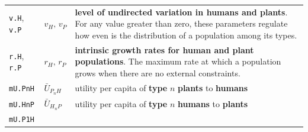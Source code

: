 \documentclass[]{book}
\begin{document}
\begin{longtable}[]{@{}lll@{}}
\begin{minipage}[t]{0.27\columnwidth}
\texttt{v.H}, \texttt{v.P}\strut
\end{minipage} & \begin{minipage}[t]{0.25\columnwidth}\raggedright
\(v_{H},\,v_{P}\)\strut
\end{minipage} & \begin{minipage}[t]{0.40\columnwidth}\raggedright
\textbf{level of undirected variation in humans and plants}. For any value greater than zero, these parameters regulate how even is the distribution of a population among its types.\strut
\end{minipage}\tabularnewline
\begin{minipage}[t]{0.27\columnwidth}\raggedright
\texttt{r.H}, \texttt{r.P}\strut
\end{minipage} & \begin{minipage}[t]{0.25\columnwidth}\raggedright
\(r_{H},\,r_{P}\)\strut
\end{minipage} & \begin{minipage}[t]{0.40\columnwidth}\raggedright
\textbf{intrinsic growth rates for human and plant populations}. The maximum rate at which a population grows when there are no external constraints.\strut
\end{minipage}\tabularnewline
\begin{minipage}[t]{0.27\columnwidth}\raggedright
\texttt{mU.PnH}\strut
\end{minipage} & \begin{minipage}[t]{0.25\columnwidth}\raggedright
\(\bar{U}_{P_{n}H}\)\strut
\end{minipage} & \begin{minipage}[t]{0.40\columnwidth}\raggedright
utility per capita of \textbf{type} \(n\) \textbf{plants} to \textbf{humans}\strut
\end{minipage}\tabularnewline
\begin{minipage}[t]{0.27\columnwidth}\raggedright
\texttt{mU.HnP}\strut
\end{minipage} & \begin{minipage}[t]{0.25\columnwidth}\raggedright
\(\bar{U}_{H_{n}P}\)\strut
\end{minipage} & \begin{minipage}[t]{0.40\columnwidth}\raggedright
utility per capita of \textbf{type} \(n\) \textbf{humans} to \textbf{plants}\strut
\end{minipage}\tabularnewline
\begin{minipage}[t]{0.27\columnwidth}\raggedright
\texttt{mU.P1H}\strut
\end{minipage} & \begin{minipage}[t]{0.25\columnwidth}\raggedright

\end{minipage}
\end{longtable}
\end{document}
